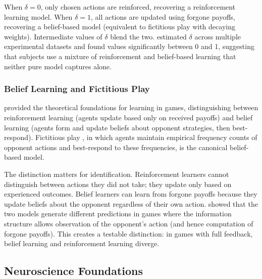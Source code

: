 When $\delta = 0$, only chosen actions are reinforced, recovering a reinforcement learning model. When $\delta = 1$, all actions are updated using forgone payoffs, recovering a belief-based model (equivalent to fictitious play with decaying weights). Intermediate values of $\delta$ blend the two. \citet{CamererHo1999} estimated $\delta$ across multiple experimental datasets and found values significantly between 0 and 1, suggesting that subjects use a mixture of reinforcement and belief-based learning that neither pure model captures alone.

\subsubsection{Belief Learning and Fictitious Play}

\citet{FudenbergLevine1998} provided the theoretical foundations for learning in games, distinguishing between reinforcement learning (agents update based only on received payoffs) and belief learning (agents form and update beliefs about opponent strategies, then best-respond). Fictitious play \citep{Brown1951}, in which agents maintain empirical frequency counts of opponent actions and best-respond to these frequencies, is the canonical belief-based model.

The distinction matters for identification. Reinforcement learners cannot distinguish between actions they did not take; they update only based on experienced outcomes. Belief learners can learn from forgone payoffs because they update beliefs about the opponent regardless of their own action. \citet{FudenbergLevine1998} showed that the two models generate different predictions in games where the information structure allows observation of the opponent's action (and hence computation of forgone payoffs). This creates a testable distinction: in games with full feedback, belief learning and reinforcement learning diverge.

\subsection{Neuroscience Foundations}

